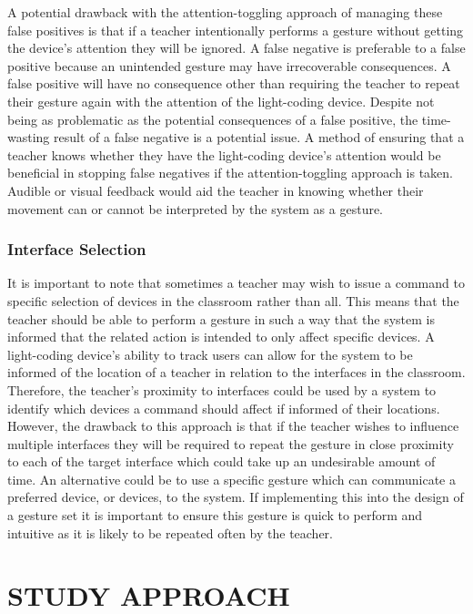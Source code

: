 \documentclass[link]{IWCOMP}
\begin{document}
A potential drawback with the attention-toggling approach of managing these false positives is that if a teacher intentionally performs a gesture without getting the device's attention they will be ignored.
A false negative is preferable to a false positive because an unintended gesture may have irrecoverable consequences.
A false positive will have no consequence other than requiring the teacher to repeat their gesture again with the attention of the light-coding device.
Despite not being as problematic as the potential consequences of a false positive, the time-wasting result of a false negative is a potential issue.
A method of ensuring that a teacher knows whether they have the light-coding device's attention would be beneficial in stopping false negatives if the attention-toggling approach is taken.
Audible or visual feedback would aid the teacher in knowing whether their movement can or cannot be interpreted by the system as a gesture.

\subsubsection{Interface Selection}  
\label{subsubsec:interfaceSelection}

It is important to note that sometimes a teacher may wish to issue a command to specific selection of devices in the classroom rather than all.
This means that the teacher should be able to perform a gesture in such a way that the system is informed that the related action is intended to only affect specific devices.
A light-coding device's ability to track users can allow for the system to be informed of the location of a teacher in relation to the interfaces in the classroom.
Therefore, the teacher's proximity to interfaces could be used by a system to identify which devices a command should affect if informed of their locations.
However, the drawback to this approach is that if the teacher wishes to influence multiple interfaces they will be required to repeat the gesture in close proximity to each of the target interface which could take up an undesirable amount of time.
An alternative could be to use a specific gesture which can communicate a preferred device, or devices, to the system.
If implementing this into the design of a gesture set it is important to ensure this gesture is quick to perform and intuitive as it is likely to be repeated often by the teacher.

\section{STUDY APPROACH} 
\label{sec:studyApproach}
\end{document}
